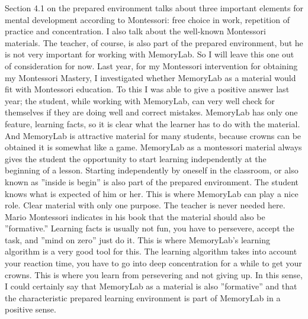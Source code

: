 \documentclass[12pt, a4paper]{article}
\begin{document}
Section 4.1 on the prepared environment talks about three important elements for mental development according to Montessori: free choice in work, repetition of practice and concentration. I also talk about the well-known Montessori materials. The teacher, of course, is also part of the prepared environment, but he is not very important for working with MemoryLab. So I will leave this one out of consideration for now. Last year, for my Montessori intervention for obtaining my Montessori Mastery, I investigated whether MemoryLab as a material would fit with Montessori education. To this I was able to give a positive answer last year; the student, while working with MemoryLab, can very well check for themselves if they are doing well and correct mistakes. MemoryLab has only one feature, learning facts, so it is clear what the learner has to do with the material. And MemoryLab is attractive material for many students, because crowns can be obtained it is somewhat like a game. MemoryLab as a montessori material always gives the student the opportunity to start learning independently at the beginning of a lesson. Starting independently by oneself in the classroom, or also known as ''inside is begin'' is also part of the prepared environment. The student knows what is expected of him or her. This is where MemoryLab can play a nice role. Clear material with only one purpose. The teacher is never needed here.
Mario Montessori indicates in his book \cite[]{Mario} that the material should also be ''formative.'' Learning facts is usually not fun, you have to persevere, accept the task, and ''mind on zero'' just do it. This is where MemoryLab's learning algorithm is a very good tool for this. The learning algorithm takes into account your reaction time, you have to go into deep concentration for a while to get your crowns. This is where you learn from persevering and not giving up. In this sense, I could certainly say that MemoryLab as a material is also ''formative'' and that the characteristic prepared learning environment is part of MemoryLab in a positive sense.
\end{document}
